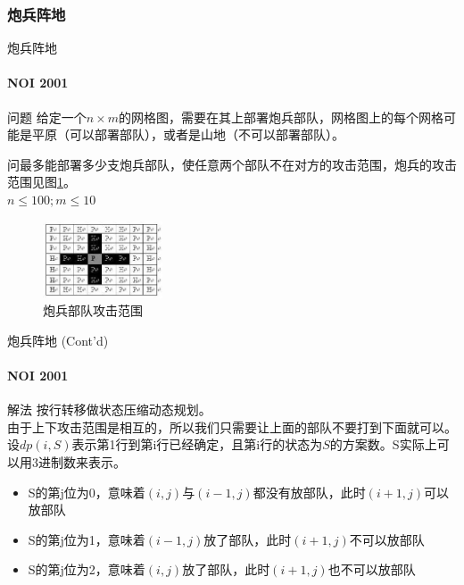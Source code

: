 \documentclass[hyperref={unicode=true}]{beamer}
\theoremstyle{definition}
\theoremstyle{proof}
\begin{document}
\subsubsection{炮兵阵地}
\begin{frame}{炮兵阵地}\framesubtitle{NOI 2001}
  \begin{block}{问题}
    给定一个$n \times m$的网格图，需要在其上部署炮兵部队，网格图上的每个网格可能是平原（可以部署部队），或者是山地（不可以部署部队）。\\
    \begin{minipage}{0.45\linewidth}
      问最多能部署多少支炮兵部队，使任意两个部队不在对方的攻击范围，炮兵的攻击范围见图\ref{fig:attack}。\\
      $n \leq 100; m \leq 10$
    \end{minipage}
    \begin{minipage}{0.45\linewidth}
      \begin{figure}
        \centering
        \includegraphics[width=1.4in]{figures/attack.png}
        \caption{炮兵部队攻击范围}\label{fig:attack}
      \end{figure}
    \end{minipage}
  \end{block}
\end{frame}

\begin{frame}{炮兵阵地 (Cont'd)}\framesubtitle{NOI 2001}
  \begin{exampleblock}{解法}
    按行转移做状态压缩动态规划。\\
    由于上下攻击范围是相互的，所以我们只需要让上面的部队不要打到下面就可以。\\
    设$dp(i,S)$表示第1行到第i行已经确定，且第i行的状态为$S$的方案数。S实际上可以用3进制数来表示。
    \begin{itemize}
    \item S的第j位为0，意味着$(i,j)$与$(i-1,j)$都没有放部队，此时$(i+1,j)$可以放部队
    \item S的第j位为1，意味着$(i-1,j)$放了部队，此时$(i+1,j)$不可以放部队
    \item S的第j位为2，意味着$(i,j)$放了部队，此时$(i+1,j)$也不可以放部队
    \end{itemize}
  \end{exampleblock}
\end{frame}
\end{document}

